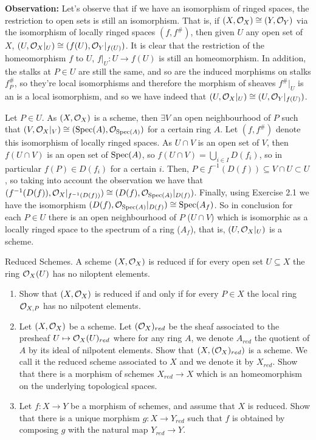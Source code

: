 \begin{sol}
	\textbf{Observation:} Let's observe that if we have an isomorphism of ringed spaces, the restriction to open sets is still an isomorphism. That is, if $(X, \mathcal{O}_X) \cong (Y, \mathcal{O}_Y)$ via the isomorphism of locally ringed spaces $(f, f^{\#})$, then given $U$ any open set of $X$, $(U, \mathcal{O}_X|_U) \cong (f(U), \mathcal{O}_Y|_{f(U)})$. It is clear that the restriction of the homeomorphism $f$ to $U$, $f|_U: U \to f(U)$ is still an homeomorphism. In addition, the stalks at $P \in U$ are still the same, and so are the induced morphisms on stalks $f^{\#}_P$, so they're local isomorphisms and therefore the morphism of sheaves $f^{\#}|_U$ is an is a local isomorphism, and so we have indeed that $(U, \mathcal{O}_X|_U) \cong (U, \mathcal{O}_Y|_{f(U)})$.

	Let $P \in U$. As $(X, \mathcal{O}_X)$ is a scheme, then $\exists V$ an open neighbourhood of $P$ such that $(V,\mathcal{O}_X|_V) \cong (\mathrm{Spec} (A), \mathcal{O}_{\mathrm{Spec}(A)})$ for a certain ring $A$. Let $(f, f^{\#})$ denote this isomorphism of locally ringed spaces. As $U \cap V$ is an open set of $V$, then $f(U \cap V)$ is an open set of $\mathrm{Spec}(A)$, so $f(U \cap V) = \bigcup_{i \in I} D(f_i)$, so in particular $f(P) \in D(f_i)$ for a certain $i$. Then, $P \in f^{-1}(D(f)) \subseteq V \cap U \subset U$, so taking into account the observation we have that $(f^{-1}(D(f)), \mathcal{O}_X|_{f^{-1}(D(f))}) \cong (D(f), \mathcal{O}_{\mathrm{Spec}(A)}|_{D(f)})$. Finally, using Exercise 2.1 we have the isomorphism $(D(f), \mathcal{O}_{\mathrm{Spec}(A)}|_{D(f)}) \cong \mathrm{Spec}(A_f)$. So in conclusion for each $P \in U$ there is an open neighbourhood of $P$ ($U \cap V$) which is isomorphic as a locally ringed space to the spectrum of a ring ($A_f$), that is, $(U, \mathcal{O}_X|_U)$ is a scheme.
\end{sol}

\begin{ex}
	Reduced Schemes. A scheme $(X, \mathcal{O}_X)$ is reduced if for every open set $U \subseteq X$ the ring $\mathcal{O}_X(U)$ has no niloptent elements.
	\begin{enumerate}[label=\alph*)]
		\item Show that $(X, \mathcal{O}_X)$ is reduced if and only if for every $P \in X$ the local ring $\mathcal{O}_{X,P}$ has no nilpotent elements.
		\item Let $(X, \mathcal{O}_X)$ be a scheme. Let $(\mathcal{O}_X)_{red}$ be the sheaf associated to the presheaf $U \mapsto \mathcal{O}_X(U)_{red}$ where for any ring $A$, we denote $A_{red}$ the quotient of $A$ by its ideal of nilpotent elements. Show that $(X, (\mathcal{O}_X)_{red})$ is a scheme. We call it the reduced scheme associated to $X$ and we denote it by $X_{red}$. Show that there is a morphism of schemes $X_{red} \to X$ which is an homeomorphism on the underlying topological spaces. 
		\item Let $f: X \to Y$ be a morphism of schemes, and assume that $X$ is reduced. Show that there is a unique morphism $g: X \to Y_{red}$ such that $f$ is obtained by composing $g$ with the natural map $Y_{red} \to Y$.
	\end{enumerate}
\end{ex}

